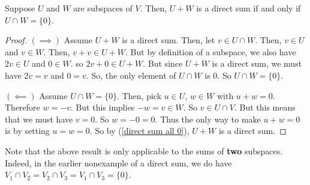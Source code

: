 \begin{theorem}
    Suppose $U$ and $W$ are subspaces of $V$. Then, $U+W$ is a direct sum if and only if $U\cap W = \{0\}$.
\end{theorem}
\begin{proof}
    $(\implies)$ Assume $U+W$ is a direct sum. Then, let $v \in U\cap W$. Then, $v \in U$ and $v\in W$. Then, $v +v \in U+W$. But by definition of a subspace, we also have $2v \in U$ and $0 \in W$. so $2v + 0 \in U+W$. But since $U+W$ is a direct sum, we must have $2v = v$ and $0 = v$. So, the only element of $U\cap W$ is $0$. So $U\cap W = \{0\}$.

    $(\impliedby)$ Assume $U\cap W = \{0\}$. Then, pick $u\in U$, $w\in W$ with $u+w = 0$. Therefore $w = -v$. But this implies $-w = v \in W$. So $v \in U\cap V$. But this means that we must have $v = 0$. So $w = -0 = 0$. Thus the only way to make $u+w=0$ is by setting $u=w=0$. So by (\ref{direct sum all 0}), $U+W$ is a direct sum.
\end{proof}
Note that the above result is only applicable to the sums of \textbf{two} subspaces. Indeed, in the earlier nonexample of a direct sum, we do have $V_1 \cap V_2 = V_2 \cap V_3 = V_1 \cap V_3 = \{0\}$.